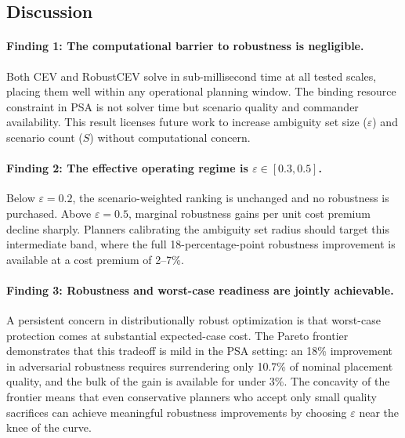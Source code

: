 \documentclass[11pt]{article}
\begin{document}
\subsection{Discussion}
\label{sec:exp4:discussion}

\paragraph{Finding 1: The computational barrier to robustness is negligible.}
Both CEV and RobustCEV solve in sub-millisecond time at all tested scales,
placing them well within any operational planning window.  The binding
resource constraint in PSA is not solver time but scenario quality and
commander availability.  This result licenses future work to increase
ambiguity set size ($\varepsilon$) and scenario count ($S$) without
computational concern.

\paragraph{Finding 2: The effective operating regime is $\varepsilon \in [0.3, 0.5]$.}
Below $\varepsilon = 0.2$, the scenario-weighted ranking is unchanged and
no robustness is purchased.  Above $\varepsilon = 0.5$, marginal robustness
gains per unit cost premium decline sharply.  Planners calibrating the
ambiguity set radius should target this intermediate band, where the
full 18-percentage-point robustness improvement is available at a cost
premium of 2--7\%.

\paragraph{Finding 3: Robustness and worst-case readiness are jointly achievable.}
A persistent concern in distributionally robust optimization is that
worst-case protection comes at substantial expected-case cost.
The Pareto frontier demonstrates that this tradeoff is mild in the
PSA setting: an 18\% improvement in adversarial robustness requires
surrendering only 10.7\% of nominal placement quality, and the bulk
of the gain is available for under 3\%.  The concavity of the frontier
means that even conservative planners who accept only small quality
sacrifices can achieve meaningful robustness improvements by choosing
$\varepsilon$ near the knee of the curve.

\end{document}
